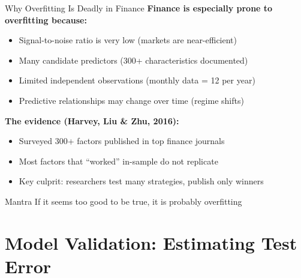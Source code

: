 \documentclass[10pt]{beamer}
\begin{document}
\begin{frame}{Why Overfitting Is Deadly in Finance}
  \textbf{Finance is especially prone to overfitting because:}
  \begin{itemize}
    \item Signal-to-noise ratio is very low (markets are near-efficient)
    \item Many candidate predictors (300+ characteristics documented)
    \item Limited independent observations (monthly data = 12 per year)
    \item Predictive relationships may change over time (regime shifts)
  \end{itemize}
  
  \vspace{0.5em}
  \textbf{The evidence (Harvey, Liu \& Zhu, 2016):}
  \begin{itemize}
    \item Surveyed 300+ factors published in top finance journals
    \item Most factors that ``worked'' in-sample do not replicate
    \item Key culprit: researchers test many strategies, publish only winners
  \end{itemize}
  
  \vspace{0.5em}
  \begin{block}{Mantra}
    If it seems too good to be true, it is probably overfitting
  \end{block}
\end{frame}

\section{Model Validation: Estimating Test Error}
\end{document}
